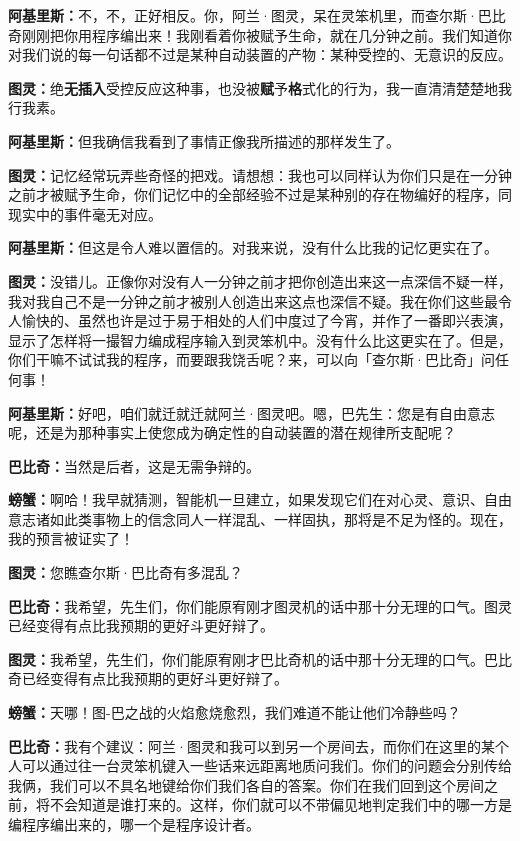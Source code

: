 \documentclass[
  12pt,
  twoside,
  openright,
  oldfontcommands,
]{memoir}
\newcommand{\heititext}[1]{{\heifamily\bfseries #1}}
\newcommand{\dialogname}[1]{{\heifamily\bfseries #1}}
\begin{document}
\dialogname{阿基里斯：}不，不，正好相反。你，阿兰·图灵，呆在灵笨机里，而查尔斯·巴比奇刚刚把你用程序编出来！我刚看着你被赋予生命，就在几分钟之前。我们知道你对我们说的每一句话都不过是某种自动装置的产物：某种受控的、无意识的反应。

\dialogname{图灵：}绝\heititext{无插入}受控反应这种事，也没被\heititext{赋}予\heititext{格}式化的行为，我一直清清楚楚地我行我素。

\dialogname{阿基里斯：}但我确信我看到了事情正像我所描述的那样发生了。

\dialogname{图灵：}记忆经常玩弄些奇怪的把戏。请想想：我也可以同样认为你们只是在一分钟之前才被赋予生命，你们记忆中的全部经验不过是某种别的存在物编好的程序，同现实中的事件毫无对应。

\dialogname{阿基里斯：}但这是令人难以置信的。对我来说，没有什么比我的记忆更实在了。

\dialogname{图灵：}没错儿。正像你对没有人一分钟之前才把你创造出来这一点深信不疑一样，我对我自己不是一分钟之前才被别人创造出来这点也深信不疑。我在你们这些最令人愉快的、虽然也许是过于易于相处的人们中度过了今宵，并作了一番即兴表演，显示了怎样将一撮智力编成程序输入到灵笨机中。没有什么比这更实在了。但是，你们干嘛不试试我的程序，而要跟我饶舌呢？来，可以向「查尔斯·巴比奇」问任何事！

\dialogname{阿基里斯：}好吧，咱们就迁就迁就阿兰·图灵吧。嗯，巴先生：您是有自由意志呢，还是为那种事实上使您成为确定性的自动装置的潜在规律所支配呢？

\dialogname{巴比奇：}当然是后者，这是无需争辩的。

\dialogname{螃蟹：}啊哈！我早就猜测，智能机一旦建立，如果发现它们在对心灵、意识、自由意志诸如此类事物上的信念同人一样混乱、一样固执，那将是不足为怪的。现在，我的预言被证实了！

\dialogname{图灵：}您瞧查尔斯·巴比奇有多混乱？

\dialogname{巴比奇：}我希望，先生们，你们能原宥刚才图灵机的话中那十分无理的口气。图灵已经变得有点比我预期的更好斗更好辩了。

\dialogname{图灵：}我希望，先生们，你们能原宥刚才巴比奇机的话中那十分无理的口气。巴比奇已经变得有点比我预期的更好斗更好辩了。

\dialogname{螃蟹：}天哪！图-巴之战的火焰愈烧愈烈，我们难道不能让他们冷静些吗？

\dialogname{巴比奇：}我有个建议：阿兰·图灵和我可以到另一个房间去，而你们在这里的某个人可以通过往一台灵笨机键入一些话来远距离地质问我们。你们的问题会分别传给我俩，我们可以不具名地键给你们我们各自的答案。你们在我们回到这个房间之前，将不会知道是谁打来的。这样，你们就可以不带偏见地判定我们中的哪一方是编程序编出来的，哪一个是程序设计者。
\end{document}
